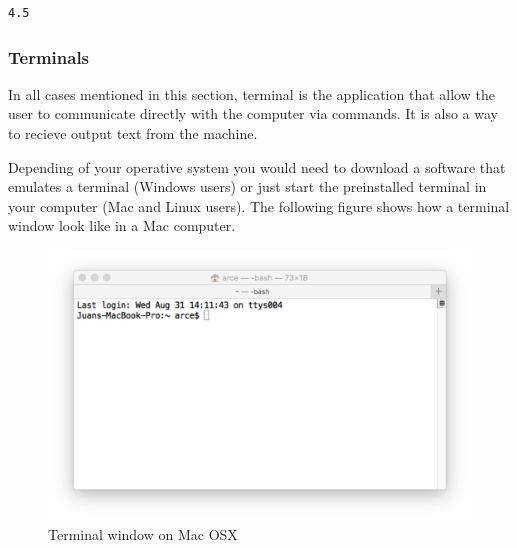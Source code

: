 \documentclass[11pt]{article}
\begin{document}
\begin{verbatim}
4.5
\end{verbatim}

\subsubsection{Terminals}
\label{sec:orgc9f20ef}
In all cases mentioned in this section, terminal is the application that allow the user to communicate directly with the computer via commands. It is also a way to recieve output text from the machine.

Depending of your operative system you would need to download a software that emulates a terminal (Windows users) or just start the preinstalled terminal in your computer (Mac and Linux users). The following figure shows how a terminal window look like in a Mac computer.

\begin{figure}[htbp]
\centering
\includegraphics[width=.9\linewidth]{./figures/terminal-mac.png}
\caption{Terminal window on Mac OSX}
\end{figure}
\end{document}
